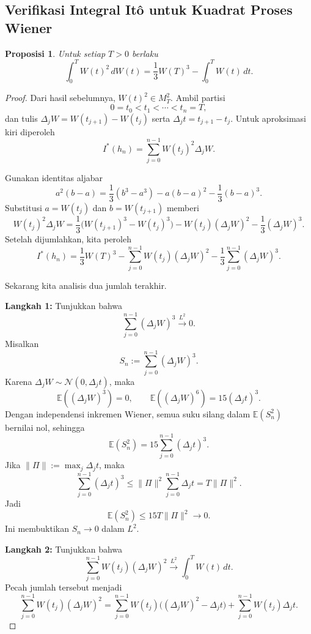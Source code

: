 \documentclass[12pt,a4paper]{article}
\theoremstyle{definition}
\theoremstyle{plain}
\newtheorem{proposisi}[definisi]{Proposisi}
\newcommand{\E}{\mathbb{E}}
\begin{document}
\subsection{Verifikasi Integral It\^o untuk Kuadrat Proses Wiener}

\begin{proposisi}
  Untuk setiap $T>0$ berlaku
  \[
    \int_0^T W(t)^2\,dW(t)
    =
    \frac13 W(T)^3-\int_0^T W(t)\,dt.
  \]
\end{proposisi}

\begin{proof}
  Dari hasil sebelumnya, $W(t)^2\in M_T^2$. Ambil partisi
  \[
    0=t_0<t_1<\cdots<t_n=T,
  \]
  dan tulis $\Delta_jW=W(t_{j+1})-W(t_j)$ serta $\Delta_jt=t_{j+1}-t_j$. Untuk
  aproksimasi kiri diperoleh
  \[
    I^\ast(h_n)=\sum_{j=0}^{n-1}W(t_j)^2\Delta_jW.
  \]

  Gunakan identitas aljabar
  \[
    a^2(b-a)
    =
    \frac13(b^3-a^3)-a(b-a)^2-\frac13(b-a)^3.
  \]
  Substitusi $a=W(t_j)$ dan $b=W(t_{j+1})$ memberi
  \[
    W(t_j)^2\Delta_jW
    =
    \frac13\bigl(W(t_{j+1})^3-W(t_j)^3\bigr)
    -
    W(t_j)(\Delta_jW)^2
    -
    \frac13(\Delta_jW)^3.
  \]
  Setelah dijumlahkan, kita peroleh
  \[
    I^\ast(h_n)
    =
    \frac13 W(T)^3
    -
    \sum_{j=0}^{n-1}W(t_j)(\Delta_jW)^2
    -
    \frac13\sum_{j=0}^{n-1}(\Delta_jW)^3.
  \]

  Sekarang kita analisis dua jumlah terakhir.

  \textbf{Langkah 1:} Tunjukkan bahwa
  \[
    \sum_{j=0}^{n-1}(\Delta_jW)^3\xrightarrow{L^2}0.
  \]
  Misalkan
  \[
    S_n:=\sum_{j=0}^{n-1}(\Delta_jW)^3.
  \]
  Karena $\Delta_jW\sim\mathcal{N}(0,\Delta_jt)$, maka
  \[
    \E((\Delta_jW)^3)=0,
    \qquad
    \E((\Delta_jW)^6)=15(\Delta_jt)^3.
  \]
  Dengan independensi inkremen Wiener, semua suku silang dalam $\E(S_n^2)$
  bernilai nol, sehingga
  \[
    \E(S_n^2)=15\sum_{j=0}^{n-1}(\Delta_jt)^3.
  \]
  Jika $\|\Pi\|:=\max_j\Delta_jt$, maka
  \[
    \sum_{j=0}^{n-1}(\Delta_jt)^3
    \le
    \|\Pi\|^2\sum_{j=0}^{n-1}\Delta_jt
    =
    T\|\Pi\|^2.
  \]
  Jadi
  \[
    \E(S_n^2)\le 15T\|\Pi\|^2\to 0.
  \]
  Ini membuktikan $S_n\to 0$ dalam $L^2$.

  \textbf{Langkah 2:} Tunjukkan bahwa
  \[
    \sum_{j=0}^{n-1}W(t_j)(\Delta_jW)^2
    \xrightarrow{L^2}
    \int_0^T W(t)\,dt.
  \]
  Pecah jumlah tersebut menjadi
  \[
    \sum_{j=0}^{n-1}W(t_j)(\Delta_jW)^2
    =
    \sum_{j=0}^{n-1}W(t_j)\bigl((\Delta_jW)^2-\Delta_jt\bigr)
    +
    \sum_{j=0}^{n-1}W(t_j)\Delta_jt.
  \]


\end{proof}
\end{document}
